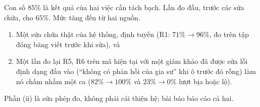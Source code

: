 Con số $85\%$ là kết quả của hai việc cần tách bạch. Lần đo đầu, trước các sửa chữa, cho $65\%$. Mức tăng đến từ hai nguồn.
\begin{enumerate}[label=(\roman*)]
  \item Một sửa chữa thật của hệ thống, định tuyến (R1: $71\%\to96\%$, đo trên tập đóng băng viết trước khi sửa), và
  \item Một lần đo lại R5, R6 trên mã hiện tại với một giám khảo đã được sửa lỗi định dạng đầu vào (``không có phản hồi của gia sư'' khi ô trước đó rỗng) làm nó chấm nhầm một ca ($82\%\to100\%$ và $23\%\to0\%$ lượt bịa hoặc lộ).
\end{enumerate}
Phần (ii) là sửa phép đo, không phải cải thiện hệ; bài báo báo cáo cả hai.

\begin{table}[tp]
\centering
\caption{Bảy định hướng của phần truy xuất và mức đạt. Mức đạt $=\min(1,x/\tau)$ với mục tiêu ``$\ge$'', $\min(1,\tau/x)$ với ``$\le$''; lấy con số thấp hơn giữa chương mẫu và chương phát hành. R1--R4 và R7: tập giữ riêng; R5, R6: $21$ ca của lời nói có căn cứ.}
\label{tab:targets}

\end{table}
